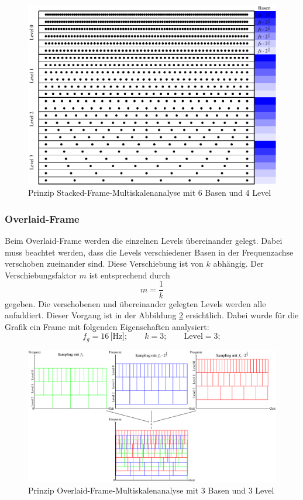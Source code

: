 \begin{figure}
\centering
\includegraphics[width=\linewidth]{papers/autotune/sections/frames/images/msa/msa.pdf}
\caption{Prinzip Stacked-Frame-Multiskalenanalyse mit 6 Basen und 4 Level}\label{fig:Stacked_frame}
\end{figure}%

\subsubsection{Overlaid-Frame}

Beim Overlaid-Frame werden die einzelnen Levels übereinander gelegt. Dabei muss beachtet werden, dass die Levels verschiedener Basen in der Frequenzachse verschoben zueinander sind. Diese Verschiebung ist von $k$ abhängig. Der Verschiebungsfaktor $m$ ist entsprechend durch
\[
m= \frac{1}{k}
\]
gegeben. Die verschobenen und übereinander gelegten Levels werden alle aufaddiert. Dieser Vorgang ist in der Abbildung \ref{fig:Overlaid_frame} ersichtlich. Dabei wurde für die Grafik ein Frame mit folgenden Eigenschaften analysiert:
\[ 
f_{g}=16\,\text{[Hz]}; \qquad
k = 3; \qquad
\text{Level} = 3; 
\]

\begin{figure}
	\centering
	\includegraphics[width=\linewidth]{papers/autotune/sections/frames/images/frame/msa.pdf}
	\caption{Prinzip Overlaid-Frame-Multiskalenanalyse mit 3 Basen und 3 Level}\label{fig:Overlaid_frame}
\end{figure}%


